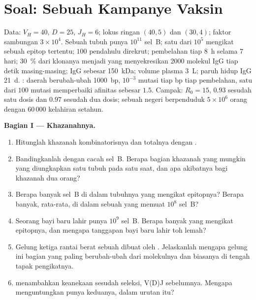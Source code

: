 \section{Soal: Sebuah Kampanye Vaksin}

\begin{problem}
\label{pb:b3:adaptive-immunity:1}
Data: $V_{H} = 40$, $D = 25$, $J_{H} = 6$; lokus ringan $(40, 5)$ dan
$(30, 4)$; faktor sambungan $3\times 10^{4}$. Sebuah tubuh punya $10^{11}$
sel~B; satu dari $10^{5}$ mengikat sebuah epitop tertentu; $100$ pendahulu
direkrut; pembelahan tiap \qty{8}{h} selama $7$ hari; \qty{30}{\%} dari
klonanya menjadi  yang menyekresikan $2000$ molekul IgG tiap detik
masing-masing; IgG sebesar \qty{150}{kDa}; volume plasma \qty{3}{L}; paruh hidup IgG
\qty{21}{d}. : daerah berubah-ubah \qty{1000}{bp}, $10^{-3}$
mutasi tiap bp tiap pembelahan, satu dari $100$ mutasi memperbaiki
afinitas sebesar $1.5$. Campak: $R_{0} = 15$,  $0.93$
sesudah satu dosis dan $0.97$ sesudah dua dosis; sebuah negeri berpenduduk $5\times 10^{6}$
orang dengan $60\,000$ kelahiran setahun.

\medskip
\noindent\textbf{Bagian I --- Khazanahnya.}
\begin{enumerate}
  \item Hitunglah khazanah kombinatorisnya dan totalnya dengan
        .
  \item Bandingkanlah dengan cacah sel~B. Berapa bagian khazanah yang
        mungkin yang diungkapkan satu tubuh pada satu saat, dan apa
        akibatnya bagi khazanah dua orang?
  \item Berapa banyak sel~B di dalam tubuhnya yang mengikat epitopnya? Berapa
        banyak, rata-rata, di dalam sebuah  yang memuat $10^{8}$ sel~B?
  \item Seorang bayi baru lahir punya $10^{9}$ sel~B. Berapa banyak yang mengikat
        epitopnya, dan mengapa tanggapan bayi baru lahir toh lemah?
  \item Gelung ketiga rantai berat sebuah  dibuat oleh . Jelaskanlah mengapa gelung ini bagian yang paling
        berubah-ubah dari molekulnya dan biasanya di tengah tapak pengikatnya.
  \item {} menambahkan keanekaan sesudah seleksi, V(D)J
        sebelumnya. Mengapa menguntungkan punya keduanya, dalam urutan itu?
\end{enumerate}


\end{problem}
